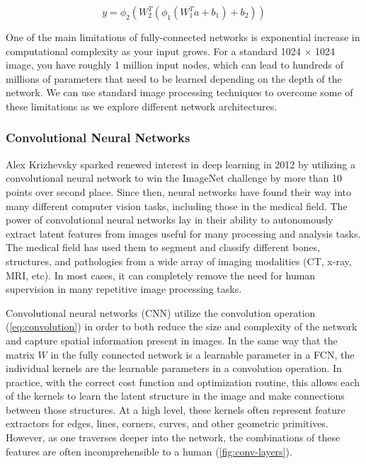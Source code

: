 \begin{equation}
    y = \phi_2 (W_2^{T}(\phi_1(W_1^{T}a + b_1) + b_2))
    \label{eq:2-layer-fcn}
\end{equation}

One of the main limitations of fully-connected networks is exponential increase in computational complexity as your input grows. For a standard 1024 $\times$ 1024 image, you have roughly 1 million input nodes, which can lead to hundreds of millions of parameters that need to be learned depending on the depth of the network. We can use standard image processing techniques to overcome some of these limitations as we explore different network architectures.

\subsubsection{Convolutional Neural Networks}

Alex Krizhevsky sparked renewed interest in deep learning in 2012 by utilizing a convolutional neural network to win the ImageNet challenge \cite{russakovskyImageNetLargeScale2015} by more than 10 points over second place. Since then, neural networks have found their way into many different computer vision tasks, including those in the medical field. The power of convolutional neural networks lay in their ability to autonomously extract latent features from images useful for many processing and analysis tasks. The medical field has used them to segment and classify different bones, structures, and pathologies from a wide array of imaging modalities (CT, x-ray, MRI, etc). In most cases, it can completely remove the need for human supervision in many repetitive image processing tasks.

Convolutional neural networks (CNN) utilize the convolution operation (\cref{eq:convolution}) in order to both reduce the size and complexity of the network and capture spatial information present in images. In the same way that the matrix $W$ in the fully connected network is a learnable parameter in a FCN, the individual kernels are the learnable parameters in a convolution operation. In practice, with the correct cost function and optimization routine, this allows each of the kernels to learn the latent structure in the image and make connections between those structures. At a high level, these kernels often represent feature extractors for edges, lines, corners, curves, and other geometric primitives. However, as one traverses deeper into the network, the combinations of these features are often incomprehensible to a human (\cref{fig:conv-layers}).

